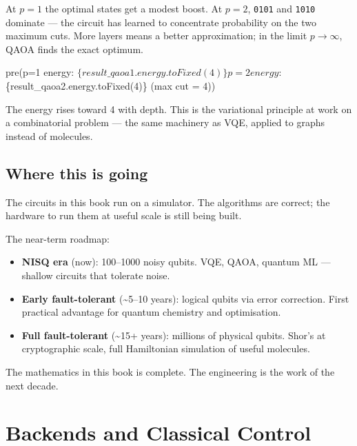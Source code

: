 \documentclass[
  11pt,
  letterpaper,
  oneside]{scrbook}
\newenvironment{Shaded}{\begin{snugshade}}{\end{snugshade}}
\newcommand{\NormalTok}[1]{\textcolor[rgb]{0.00,0.23,0.31}{#1}}
\providecommand{\tightlist}{%
  \setlength{\itemsep}{0pt}\setlength{\parskip}{0pt}}
\begin{document}
At \(p=1\) the optimal states get a modest boost. At \(p=2\),
\texttt{0101} and \texttt{1010} dominate --- the circuit has learned to
concentrate probability on the two maximum cuts. More layers means a
better approximation; in the limit \(p \to \infty\), QAOA finds the
exact optimum.

\begin{Shaded}
\begin{Highlighting}[]
\NormalTok{pre(\textasciigrave{}p=1 energy: $\{result\_qaoa1.energy.toFixed(4)\}   p=2 energy: $\{result\_qaoa2.energy.toFixed(4)\}   (max cut = 4)\textasciigrave{})}
\end{Highlighting}
\end{Shaded}

The energy rises toward 4 with depth. This is the variational principle
at work on a combinatorial problem --- the same machinery as VQE,
applied to graphs instead of molecules.

\section{Where this is going}\label{where-this-is-going}

The circuits in this book run on a simulator. The algorithms are
correct; the hardware to run them at useful scale is still being built.

The near-term roadmap:

\begin{itemize}
\tightlist
\item
  \textbf{NISQ era} (now): 100--1000 noisy qubits. VQE, QAOA, quantum ML
  --- shallow circuits that tolerate noise.
\item
  \textbf{Early fault-tolerant} (\textasciitilde5--10 years): logical
  qubits via error correction. First practical advantage for quantum
  chemistry and optimisation.
\item
  \textbf{Full fault-tolerant} (\textasciitilde15+ years): millions of
  physical qubits. Shor's at cryptographic scale, full Hamiltonian
  simulation of useful molecules.
\end{itemize}

The mathematics in this book is complete. The engineering is the work of
the next decade.

\chapter{Backends and Classical Control}\label{sec-backends}
\end{document}
